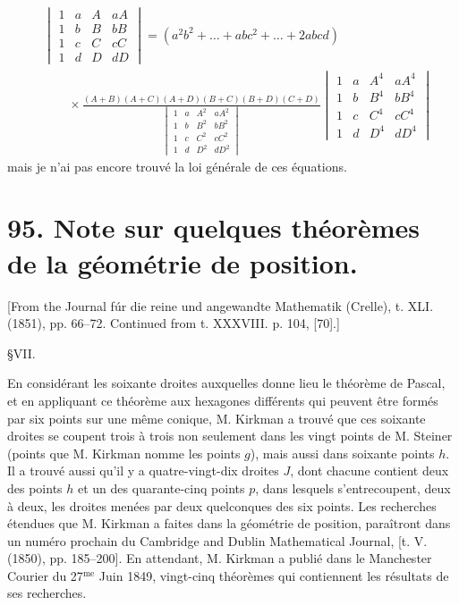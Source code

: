\documentclass[12pt,a4paper]{article}
\theoremstyle{definition}
\begin{document}
\begin{align*}
&\begin{vmatrix}
1 & a & A & aA \\
1 & b & B & bB \\
1 & c & C & cC \\
1 & d & D & dD
\end{vmatrix}
= (a^2b^2 + \ldots + abc^2 + \ldots + 2abcd) \\
&\qquad \times \frac{(A + B)(A + C)(A + D)(B + C)(B + D)(C + D)}
{\begin{vmatrix}
1 & a & A^2 & aA^2 \\
1 & b & B^2 & bB^2 \\
1 & c & C^2 & cC^2 \\
1 & d & D^2 & dD^2
\end{vmatrix}}
\begin{vmatrix}
1 & a & A^4 & aA^4 \\
1 & b & B^4 & bB^4 \\
1 & c & C^4 & cC^4 \\
1 & d & D^4 & dD^4
\end{vmatrix}
\end{align*}
mais je n'ai pas encore trouv\'{e} la loi g\'{e}n\'{e}rale de ces \'{e}quations.

\newpage

\section*{95. Note sur quelques th\'{e}or\`{e}mes de la g\'{e}om\'{e}trie de position.}

[From the Journal f\'{u}r die reine und angewandte Mathematik (Crelle), t. XLI. (1851), pp. 66--72. Continued from t. XXXVIII. p. 104, [70].]

\S VII.

En consid\'{e}rant les soixante droites auxquelles donne lieu le th\'{e}or\`{e}me de Pascal, et en appliquant ce th\'{e}or\`{e}me aux hexagones diff\'{e}rents qui peuvent \^{e}tre form\'{e}s par six points sur une m\^{e}me conique, M. Kirkman a trouv\'{e} que ces soixante droites se coupent trois \`{a} trois non seulement dans les vingt points de M. Steiner (points que M. Kirkman nomme les points $g$), mais aussi dans soixante points $h$. Il a trouv\'{e} aussi qu'il y a quatre-vingt-dix droites $J$, dont chacune contient deux des points $h$ et un des quarante-cinq points $p$, dans lesquels s'entrecoupent, deux \`{a} deux, les droites men\'{e}es par deux quelconques des six points. Les recherches \'{e}tendues que M. Kirkman a faites dans la g\'{e}om\'{e}trie de position, para\^{i}tront dans un num\'{e}ro prochain du Cambridge and Dublin Mathematical Journal, [t. V. (1850), pp. 185--200]. En attendant, M. Kirkman a publi\'{e} dans le Manchester Courier du 27$^{\text{me}}$ Juin 1849, vingt-cinq th\'{e}or\`{e}mes qui contiennent les r\'{e}sultats de ses recherches.
\end{document}
